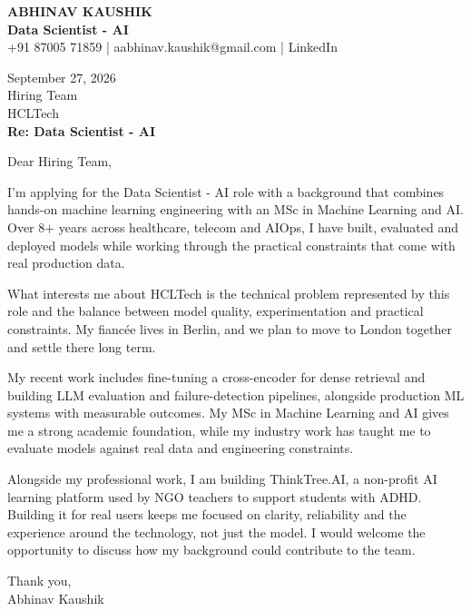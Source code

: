 \documentclass[10pt,a4paper]{article}
\begin{document}
\begin{center}
{\Large\bfseries ABHINAV KAUSHIK}\\[2pt]
{\bfseries Data Scientist - AI}\\[2pt]
+91 87005 71859 \quad | \quad aabhinav.kaushik@gmail.com \quad | \quad LinkedIn
\end{center}
\vspace{8pt}
September 27, 2026\\[6pt]
Hiring Team\\
HCLTech\\[4pt]
\textbf{Re: Data Scientist - AI}

Dear Hiring Team,

I’m applying for the Data Scientist - AI role with a background that combines hands-on machine learning engineering with an MSc in Machine Learning and AI. Over 8+ years across healthcare, telecom and AIOps, I have built, evaluated and deployed models while working through the practical constraints that come with real production data.

What interests me about HCLTech is the technical problem represented by this role and the balance between model quality, experimentation and practical constraints. My fiancée lives in Berlin, and we plan to move to London together and settle there long term.

My recent work includes fine-tuning a cross-encoder for dense retrieval and building LLM evaluation and failure-detection pipelines, alongside production ML systems with measurable outcomes. My MSc in Machine Learning and AI gives me a strong academic foundation, while my industry work has taught me to evaluate models against real data and engineering constraints.

Alongside my professional work, I am building ThinkTree.AI, a non-profit AI learning platform used by NGO teachers to support students with ADHD. Building it for real users keeps me focused on clarity, reliability and the experience around the technology, not just the model. I would welcome the opportunity to discuss how my background could contribute to the team.

Thank you,\\
Abhinav Kaushik
\end{document}
